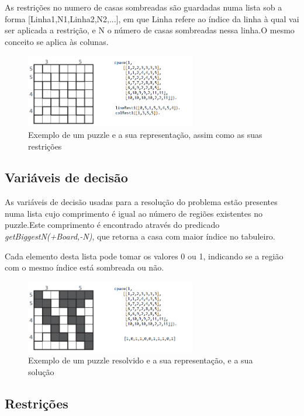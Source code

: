 \documentclass[runningheads,a4paper]{llncs}
\begin{document}
As restrições no numero de casas sombreadas são guardadas numa lista sob a forma [Linha1,N1,Linha2,N2,...], em que Linha refere ao índice da linha à qual vai ser aplicada a restrição, e N o número de casas sombreadas nessa linha.O mesmo conceito se aplica às colunas.

\begin{figure}
\centering
\includegraphics[height=3.2cm]{exemplo2.png}
\caption{Exemplo de um puzzle e a sua representação, assim como as suas restrições} 
\label{fig:crazypavementexandsol}
\end{figure}

\subsection{Variáveis de decisão}

As variáveis de decisão usadas para a resolução do problema estão presentes numa lista cujo comprimento é igual ao número de regiões existentes no puzzle.Este comprimento é encontrado através do predicado \textit{getBiggestN(+Board,-N)}, que retorna a casa com maior índice no tabuleiro.

Cada elemento desta lista pode tomar os valores 0 ou 1, indicando se a região com o mesmo índice está sombreada ou não.
\begin{figure}
\centering
\includegraphics[height=3.2cm]{exemplo3.png}
\caption{Exemplo de um puzzle resolvido e a sua representação, e a sua solução} 
\label{fig:crazypavementexandsol}
\end{figure}

\newpage

\subsection{Restrições}
\end{document}
